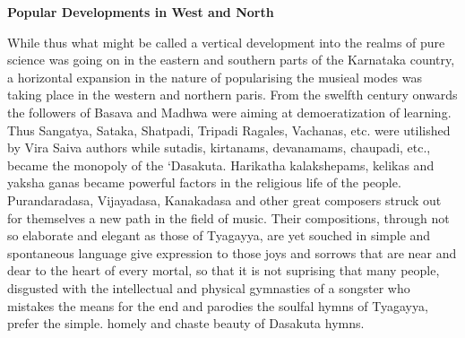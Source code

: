 \documentclass{book}
\begin{document}
\begin{center}
\textbf{Popular Developments in West and North}
\end{center}

While thus what might be called a vertical development into the realms
of pure science was going on in the eastern and southern parts of the
Karnataka country, a horizontal expansion in the nature of
popularising the musieal modes was taking place in the western and
northern paris. From the swelfth century onwards the followers of
Basava and Madhwa were aiming at demoeratization of learning. Thus
Sangatya, Sataka, Shatpadi, Tripadi Ragales, Vachanas, etc. were
utilished by Vira Saiva authors while sutadis, kirtanams, devanamams,
chaupadi, etc., became the monopoly of the `Dasakuta. Harikatha
kalakshepams, kelikas and yaksha ganas became powerful factors in the
religious life of the people. Purandaradasa, Vijayadasa, Kanakadasa
and other great composers struck out for themselves a new path in the
field of music. Their compositions, through not so elaborate and
elegant as those of Tyagayya, are yet souched in simple and
spontaneous language give expression to those joys and sorrows that
are near and dear to the heart of every mortal, so that it is not
suprising that many people, disgusted with the intellectual and
physical gymnasties of a songster who mistakes the means for the end
and parodies the soulfal  hymns of Tyagayya, prefer the simple. homely
and chaste beauty of Dasakuta hymns.
\end{document}
